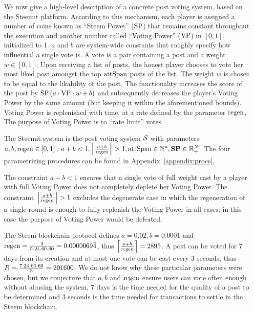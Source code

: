 \documentclass[a4paper,english,cleveref, autoref]{oasics-v2019}
\begin{document}
    We now give a high-level description of a concrete post voting system, based
    on the Steemit platform. According to this mechanism, each player is
    assigned a number of coins known as ``Steem Power'' ($\stpow$) that remains
    constant throughout the execution and another number called ``Voting Power''
    ($\votpow$) in $\left[0, 1\right]$, initialized to 1. $a$ and $b$ are
    system-wide constants that roughly specify how influential a single vote is.
    A vote is a pair containing a post and a weight $w \in \left[0, 1\right]$.
    Upon receiving a list of posts, the honest player chooses to vote her most
    liked post amongst the top $\attspan$ posts of the list. The weight $w$ is
    chosen to be equal to the likability of the post. The functionality
    increases the score of the post by $\stpow\left(a \cdot \votpow \cdot w +
    b\right)$ and subsequently decreases the player's Voting Power by the same
    amount (but keeping it within the aforementioned bounds). Voting Power is
    replenished with time, at a rate defined by the parameter $\regen$. The
    purpose of Voting Power is to ``rate limit'' votes.

\begin{definition}
  The Steemit system is the post voting system $\pvs$ with parameters $a, b,
  \regen \in \left[0, 1\right]: a + b < 1, \ceil*{\frac{a + b}{\regen}} > 1,
  \attspan \in \mathbb{N}^*, \stpowvec \in \mathbb{R}_{+}^\playerlen$. The four
  parametrizing procedures can be found in Appendix~\ref{appendix:procs}.
\end{definition}
\begin{remark}
  The constraint $a + b < 1$ ensures that a single vote of full weight cast by a
  player with full Voting Power does not completely deplete her Voting Power.
  The constraint $\ceil*{\frac{a + b}{\regen}} > 1$ excludes the degenerate
  case in which the regeneration of a single round is enough to fully replenish
  the Voting Power in all cases; in this case the purpose of Voting Power would
  be defeated.
\end{remark}

\begin{remark}
  \label{remark:steemitparms}
  The Steem blockchain protocol defines $a = 0.02, b = 0.0001$ and $\regen =
  \frac{3}{5 \cdot 24 \cdot 60 \cdot 60} = 0.0000069\bar{4}$, thus
  $\ceil*{\frac{a + b}{\regen}} = 2895$. A post can be voted for 7 days from its
  creation and at most one vote can be cast every 3 seconds, thus $\rounds =
  \frac{7 \cdot 24 \cdot 60 \cdot 60}{3} = 201600$. We do not know why these
  particular parameters were chosen, but we conjecture that $a, b$ and $\regen$
  ensure users can vote often enough without abusing the system, 7 days is the
  time needed for the quality of a post to be determined and 3 seconds is the
  time needed for transactions to settle in the Steem blockchain.
\end{remark}
\end{document}
